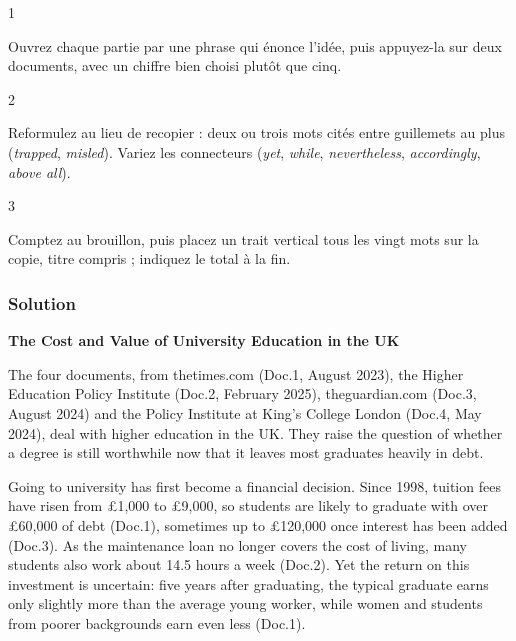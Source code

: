 \documentclass[11pt,a4paper]{article}
\begin{document}
\begin{indication}{1}

Ouvrez chaque partie par une phrase qui énonce l'idée, puis appuyez-la sur deux documents, avec un chiffre bien choisi plutôt que cinq.

\end{indication}

\begin{indication}{2}

Reformulez au lieu de recopier : deux ou trois mots cités entre guillemets au plus (\emph{trapped}, \emph{misled}). Variez les connecteurs (\emph{yet}, \emph{while}, \emph{nevertheless}, \emph{accordingly}, \emph{above all}).

\end{indication}

\begin{indication}{3}

Comptez au brouillon, puis placez un trait vertical tous les vingt mots sur la copie, titre compris ; indiquez le total à la fin.

\end{indication}

\hypertarget{solution-4}{%
\subsubsection{Solution}\label{solution-4}}

\textbf{The Cost and Value of University Education in the UK}

The four documents, from thetimes.com (Doc.1, August 2023), the Higher \textbar{} Education Policy Institute (Doc.2, February 2025), theguardian.com (Doc.3, August 2024) and the Policy Institute at King's College London (Doc.4, May \textbar{} 2024), deal with higher education in the UK. They raise the question of whether a degree is still worthwhile now \textbar{} that it leaves most graduates heavily in debt.

Going to university has first become a financial decision. Since 1998, tuition \textbar{} fees have risen from £1,000 to £9,000, so students are likely to graduate with over £60,000 of debt (Doc.1), sometimes \textbar{} up to £120,000 once interest has been added (Doc.3). As the maintenance loan no longer covers the cost of living, \textbar{} many students also work about 14.5 hours a week (Doc.2). Yet the return on this investment is uncertain: five years \textbar{} after graduating, the typical graduate earns only slightly more than the average young worker, while women and students from poorer \textbar{} backgrounds earn even less (Doc.1).
\end{document}
